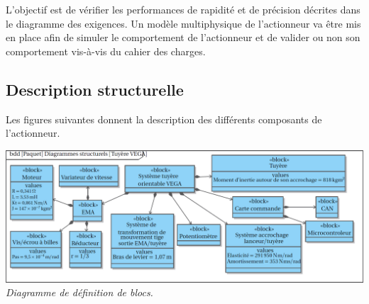 \documentclass[10pt,fleqn]{article} %
\begin{document}
\begin{multicols}{2}
%
%



\begin{obj}
L'objectif est de vérifier les performances de rapidité et de précision décrites dans le diagramme des exigences. Un modèle multiphysique de l'actionneur va être mis en place afin de simuler le comportement de l'actionneur et de valider ou non son comportement vis-à-vis du cahier des charges. 
\end{obj}


\subsection*{Description structurelle\\} 
Les figures suivantes donnent la description des différents composants de l'actionneur.
%

\begin{center}
\includegraphics[width=.95\linewidth]{images/fig_03}
\textit{Diagramme de définition de blocs.}
\end{center}


\end{multicols}
\end{document}
